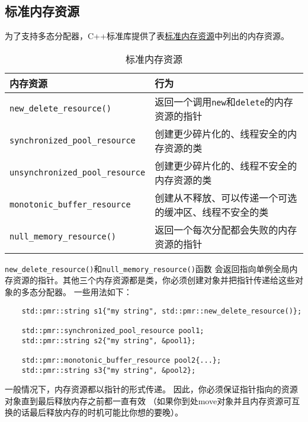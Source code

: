 \subsection{标准内存资源}
为了支持多态分配器，C++标准库提供了表\hyperref[t29.1]{标准内存资源}中列出的内存资源。
\begin{table}[htb]
    \centering
    \begin{tabular}{l|l}
        \hline
        \textbf{内存资源}                           & \textbf{行为}                                \\
        \hline
        \texttt{new\_delete\_resource()}        & 返回一个调用\texttt{new}和\texttt{delete}的内存资源的指针 \\
        \texttt{synchronized\_pool\_resource}   & 创建更少碎片化的、线程安全的内存资源的类                       \\
        \texttt{unsynchronized\_pool\_resource} & 创建更少碎片化的、线程不安全的内存资源的类                      \\
        \texttt{monotonic\_buffer\_resource}    & 创建从不释放、可以传递一个可选的缓冲区、线程不安全的类                \\
        \texttt{null\_memory\_resource()}       & 返回一个每次分配都会失败的内存资源的指针                       \\
        \hline
    \end{tabular}
    \caption{标准内存资源}
    \label{t29.1}
\end{table}

\texttt{new\_delete\_resource()}和\texttt{null\_memory\_resource()}函数
会返回指向单例全局内存资源的指针。其他三个内存资源都是类，你必须创建对象并把指针传递给这些对象的多态分配器。
一些用法如下：
\begin{lstlisting}
    std::pmr::string s1{"my string", std::pmr::new_delete_resource()};

    std::pmr::synchronized_pool_resource pool1;
    std::pmr::string s2{"my string", &pool1};

    std::pmr::monotonic_buffer_resource pool2{...};
    std::pmr::string s3{"my string", &pool2};
\end{lstlisting}
一般情况下，内存资源都以指针的形式传递。
因此，你必须保证指针指向的资源对象直到最后释放内存之前都一直有效
（如果你到处move对象并且内存资源可互换的话最后释放内存的时机可能比你想的要晚）。

